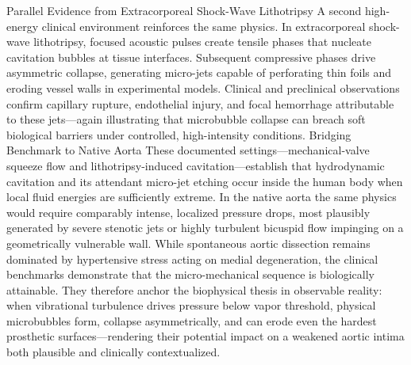 Parallel Evidence from Extracorporeal Shock-Wave Lithotripsy
A second high-energy clinical environment reinforces the same physics. In extracorporeal shock-wave lithotripsy, focused acoustic pulses create tensile phases that nucleate cavitation bubbles at tissue interfaces. Subsequent compressive phases drive asymmetric collapse, generating micro-jets capable of perforating thin foils and eroding vessel walls in experimental models. Clinical and preclinical observations confirm capillary rupture, endothelial injury, and focal hemorrhage attributable to these jets—again illustrating that microbubble collapse can breach soft biological barriers under controlled, high-intensity conditions.
Bridging Benchmark to Native Aorta
These documented settings—mechanical-valve squeeze flow and lithotripsy-induced cavitation—establish that hydrodynamic cavitation and its attendant micro-jet etching occur inside the human body when local fluid energies are sufficiently extreme. In the native aorta the same physics would require comparably intense, localized pressure drops, most plausibly generated by severe stenotic jets or highly turbulent bicuspid flow impinging on a geometrically vulnerable wall. While spontaneous aortic dissection remains dominated by hypertensive stress acting on medial degeneration, the clinical benchmarks demonstrate that the micro-mechanical sequence is biologically attainable. They therefore anchor the biophysical thesis in observable reality: when vibrational turbulence drives pressure below vapor threshold, physical microbubbles form, collapse asymmetrically, and can erode even the hardest prosthetic surfaces—rendering their potential impact on a weakened aortic intima both plausible and clinically contextualized.

